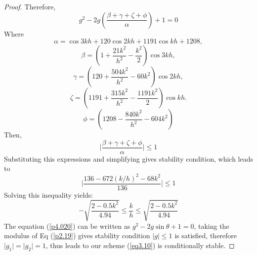 \documentclass[10pt,letterpaper,twoside]{article}
\begin{document}
\begin{proof}
 Therefore,
 \begin{equation} 
  g^2-2g( \frac{\beta+\gamma+\zeta+\phi}{\alpha}) +1=0 \label{p4.020}
 \end{equation}
 Where
 $$\alpha =\cos 3kh + 120\cos 2kh + 1191\cos kh + 1208,$$
 $$\beta =(1+\frac{21k^{2}}{h^{2}}-\frac{k^{2}}{2}) \cos 3kh,$$
 $$\gamma =(120+\frac{504k^{2}}{h^{2}}-60k^{2}) \cos 2kh,$$
 $$\zeta=(1191+\frac{315k^{2}}{h^{2}}-\frac{1191k^{2}}{2}) \cos kh.$$
 $$\phi=(1208-\frac{840k^{2}}{h^{2}}-604k^{2})$$
 Then,
 \begin{equation}
 \mid \frac{\beta+\gamma+\zeta+\phi}{\alpha} \mid \leq 1 \label{p4.019}
 \end{equation}
 Substituting this expressions and simplifying gives stability condition, which leads to
 \begin{equation}
  \mid \frac{136-672(k/h)^2-68k^2}{136} \mid \leq 1 
 \end{equation}
 Solving this inequality yields:
 \begin{equation}
 -\sqrt{\frac{2-0.5k^2}{4.94}} \leq \frac{k}{h}  \leq \sqrt{\frac{2-0.5k^2}{4.94}} 
 \end{equation}
 The equation (\ref{p4.020}) can be written as $ g^2-2g \sin\theta +1=0$, taking the modulus of Eq (\ref{p2.19}) gives stability condition $\mid g\mid \leq 1$ is satisfied, therefore $\mid g_1 \mid =\mid g_2 \mid=1 $,
 thus leads to our scheme (\ref{eq3.10}) is conditionally stable.
\end{proof}
\end{document}

